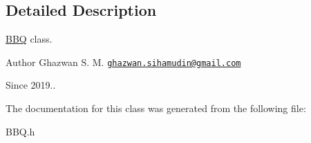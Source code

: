 \subsection{Detailed Description}
\hyperlink{classBBQ}{B\+BQ} class.

\begin{DoxyAuthor}{Author}
Ghazwan S. M. \href{mailto:ghazwan.sihamudin@gmail.com}{\tt ghazwan.\+sihamudin@gmail.\+com} 
\end{DoxyAuthor}
\begin{DoxySince}{Since}
2019.. 
\end{DoxySince}


The documentation for this class was generated from the following file\+:\begin{DoxyCompactItemize}
\item 
B\+B\+Q.\+h\end{DoxyCompactItemize}
